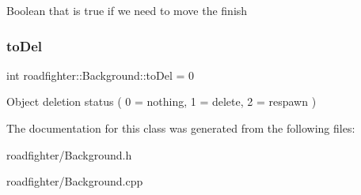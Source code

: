 Boolean that is true if we need to move the finish \mbox{\label{classroadfighter_1_1Background_a90c142a5d66d6e261bf33f6037b4f77d}} 
\subsubsection{\texorpdfstring{to\+Del}{toDel}}
{\footnotesize\ttfamily int roadfighter\+::\+Background\+::to\+Del = 0\hspace{0.3cm}{\ttfamily [protected]}}

Object deletion status ( 0 = nothing, 1 = delete, 2 = respawn ) 

The documentation for this class was generated from the following files\+:\begin{DoxyCompactItemize}
\item 
roadfighter/Background.\+h\item 
roadfighter/Background.\+cpp\end{DoxyCompactItemize}
